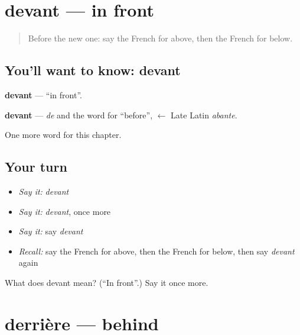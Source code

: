 \section[devant]{devant — in front}

\label{lesson:FR-C157-devant}



\begin{quote}
Before the new one: say the French for above, then the French for below.
\end{quote}

\subsection*{You'll want to know: devant}
\textbf{devant} — \textquotedblleft{}in front\textquotedblright{}.

\begin{cousinweb}
\textbf{devant} — \emph{de} and the word for \textquotedblleft{}before\textquotedblright{}, $\leftarrow$ Late Latin \emph{abante}.
\end{cousinweb}

\begin{grammarlens}[title={What you've built}]
One more word for this chapter.
\end{grammarlens}

\subsection*{Your turn}
\begin{itemize}
\raggedright
  \item \emph{Say it:} \emph{devant}
  \item \emph{Say it:} \emph{devant}, once more
  \item \emph{Say it:} say \emph{devant}
  \item \emph{Recall:} say the French for above, then the French for below, then say \emph{devant} again
\end{itemize}

\begin{tcolorbox}[breakable,colback=teal!4,colframe=teal!35!black,title={Before you move on}]
What does devant mean? (\textquotedblleft{}In front\textquotedblright{}.) Say it once more.
\end{tcolorbox}
\section[derrière]{derrière — behind}

